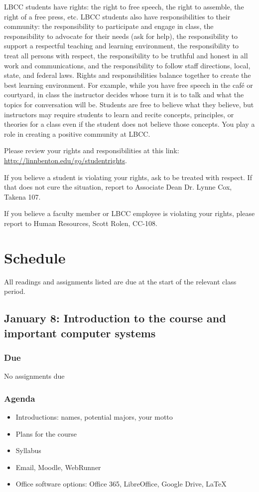 \documentclass[12pt,article,oneside]{memoir}
\begin{document}
LBCC students have rights: the right to free speech, the right to assemble, the right of a free press, etc. LBCC students also have responsibilities to their community: the responsibility to participate and engage in class, the responsibility to advocate for their needs (ask for help), the responsibility to support a respectful teaching and learning environment, the responsibility to treat all persons with respect, the responsibility to be truthful and honest in all work and communications, and the responsibility to follow staff directions, local, state, and federal laws. Rights and responsibilities balance together to create the best learning environment. For example, while you have free speech in the caf\'{e} or courtyard, in class the instructor decides whose turn it is to talk and what the topics for conversation will be. Students are free to believe what they believe, but instructors may require students to learn and recite concepts, principles, or theories for a class even if the student does not believe those concepts. You play a role in creating a positive community at LBCC. 

Please review your rights and responsibilities at this link: \url{http://linnbenton.edu/go/studentrights}.

If you believe a student is violating your rights, ask to be treated with respect. If that does not cure the situation, report to Associate Dean Dr. Lynne Cox, Takena 107.

If you believe a faculty member or LBCC employee is violating your rights, please report to Human Resources, Scott Rolen, CC-108.

\newpage

\section{Schedule}

All readings and assignments listed are due at the start of the relevant class period.

\subsection{January 8: Introduction to the course and important computer systems}

\subsubsection{Due}
No assignments due

\subsubsection{Agenda}
\begin{itemize}
 \item Introductions: names, potential majors, your motto
 \item Plans for the course
 \item Syllabus
 \item Email, Moodle, WebRunner
 \item Office software options: Office 365, LibreOffice, Google Drive, \LaTeX
\end{itemize}
\end{document}
